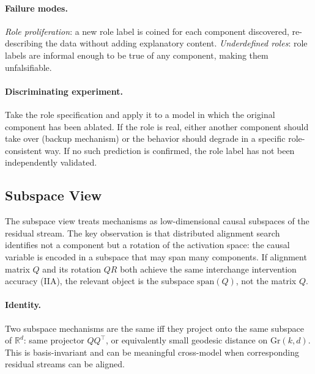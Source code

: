 \documentclass{article}
\newcommand{\Gr}{\mathrm{Gr}}
\begin{document}
\paragraph{Failure modes.}
\emph{Role proliferation}: a new role label is coined for each component
discovered, re-describing the data without adding explanatory content.
\emph{Underdefined roles}: role labels are informal enough to be true of
any component, making them unfalsifiable.

\paragraph{Discriminating experiment.}
Take the role specification and apply it to a model in which the
original component has been ablated.  If the role is real, either another
component should take over (backup mechanism) or the behavior should
degrade in a specific role-consistent way.  If no such prediction is
confirmed, the role label has not been independently validated.

\subsection{Subspace View}

The subspace view treats mechanisms as low-dimensional causal subspaces
of the residual stream.  The key observation is that distributed
alignment search \citep{geiger2021,geiger2024} identifies not a component
but a rotation of the activation space: the causal variable is encoded
in a subspace that may span many components.  If alignment matrix $Q$
and its rotation $QR$ both achieve the same interchange intervention
accuracy (IIA), the relevant object is the subspace $\mathrm{span}(Q)$,
not the matrix $Q$.

\paragraph{Identity.}
Two subspace mechanisms are the same iff they project onto the same
subspace of $\mathbb{R}^d$: same projector $QQ^\top$, or equivalently
small geodesic distance on $\Gr(k,d)$.  This is basis-invariant and
can be meaningful cross-model when corresponding residual streams can
be aligned.
\end{document}
